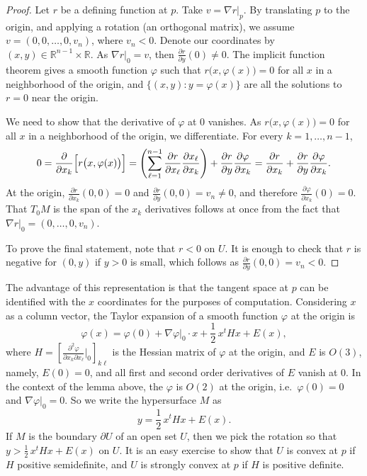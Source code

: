 \documentclass[12pt,openany]{book}
\newcommand{\avoidbreak}{\postdisplaypenalty=100}
\newcommand{\R}{{\mathbb{R}}}
\theoremstyle{plain}
\theoremstyle{remark}
\theoremstyle{definition}
\theoremstyle{exercise}
\theoremstyle{example}
\begin{document}
\begin{proof}
Let $r$ be a defining function at $p$.  Take $v = \nabla r|_p$.
By translating $p$ to the origin, and applying a rotation (an orthogonal matrix),
we assume $v = (0,0,\ldots,0,v_n)$, where $v_n < 0$.  Denote our
coordinates by $(x,y) \in \R^{n-1} \times \R$.  As $\nabla r|_0 =
v$, then $\frac{\partial r}{\partial y}(0) \not= 0$.
The implicit function theorem gives a
smooth function $\varphi$ such that
$r\bigl(x,\varphi(x)\bigr) = 0$ for all $x$ in a neighborhood of the
origin, and $\bigl\{ (x,y) : y=\varphi(x) \bigr\}$ are all the
solutions to $r = 0$ near the origin.

We need to show that the derivative of $\varphi$ at 0 vanishes.
As
$r\bigl(x,\varphi(x)\bigr) = 0$ for all $x$ in a neighborhood of the
origin, we differentiate.
For every $k=1,\ldots,n-1$,
\begin{equation*}
0 =
\frac{\partial}{\partial x_k} \Bigl[
r\bigl(x,\varphi(x)\bigr)
\Bigr]
=
\left(
\sum_{\ell=1}^{n-1}
\frac{\partial r}{\partial x_\ell}
\frac{\partial x_\ell}{\partial x_k}
\right)
+
\frac{\partial r}{\partial y}
\frac{\partial \varphi}{\partial x_k}
=
\frac{\partial r}{\partial x_k}
+
\frac{\partial r}{\partial y}
\frac{\partial \varphi}{\partial x_k} .
\avoidbreak
\end{equation*}
At the origin,
$\frac{\partial r}{\partial x_k}(0,0) = 0$ and
$\frac{\partial r}{\partial y}(0,0) = v_n \not= 0$, and therefore
$\frac{\partial \varphi}{\partial x_k}(0) = 0$.
That $T_0 M$ is the span of the $x_k$ derivatives
follows at once from the fact that $\nabla r|_0 = (0,\ldots,0,v_n)$.

To prove the final statement, note that
$r < 0$ on $U$.  It is enough to check that $r$ is
negative for $(0,y)$ if $y > 0$ is small, which follows as $\frac{\partial
r}{\partial y}(0,0) = v_n < 0$.
\end{proof}

The advantage of this representation is that the tangent space at $p$
can be identified with the $x$ coordinates for the purposes of computation.
Considering $x$ as a column vector, the Taylor expansion of a smooth function $\varphi$ at the origin is
\begin{equation*}
\varphi(x) = \varphi(0) + \nabla \varphi|_0 \cdot x + \frac{1}{2}\, x^t H x + E(x) ,
\end{equation*}
where $H = \left[
\frac{\partial^2 \varphi}{\partial x_k \partial x_\ell} \big|_{0} \right]_{k\ell}$
is the Hessian matrix of $\varphi$ at the origin,
and $E$ is $O(3)$, namely, $E(0) = 0$, and
all first and second order derivatives of $E$ vanish at $0$.
In the context of the lemma above,
the $\varphi$ is $O(2)$ at the origin, i.e.\ $\varphi(0) = 0$
and $\nabla \varphi|_0 = 0$.  So we write the hypersurface
$M$ as
\begin{equation*}
y = \frac{1}{2}\, x^t H x + E(x) .
\end{equation*}
If $M$ is the boundary
$\partial U$ of an open set $U$, then
we pick the rotation so that $y > \frac{1}{2}\,x^t H x + E(x)$ on $U$.
It is an easy exercise to show that $U$ is convex at $p$ if
$H$ positive semidefinite, and $U$ is strongly convex at $p$ if $H$ is positive definite.
\end{document}
